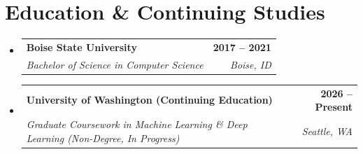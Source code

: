 \documentclass[letterpaper,11pt]{article}
\makeatletter
\newcommand{\resumeSubheading}[4]{
  \vspace{-2pt}\item
    \begin{tabular*}{1.0\textwidth}[t]{l@{\extracolsep{\fill}}r}
      \textbf{#1} & \textbf{\small #2} \\
      \textit{\small#3} & \textit{\small #4} \\
    \end{tabular*}\vspace{-7pt}
}
\newcommand{\resumeSubHeadingListStart}{\begin{itemize}[leftmargin=0.0in, label={}]}
\newcommand{\resumeSubHeadingListEnd}{\end{itemize}}
\makeatother
\begin{document}
\section{Education \& Continuing Studies}
  \resumeSubHeadingListStart
    \resumeSubheading
      {Boise State University}{2017 -- 2021}
      {Bachelor of Science in Computer Science}{Boise, ID}
    \resumeSubheading
      {University of Washington (Continuing Education)}{2026 -- Present}
      {Graduate Coursework in Machine Learning \& Deep Learning (Non-Degree, In Progress)}{Seattle, WA}
  \resumeSubHeadingListEnd
\end{document}
